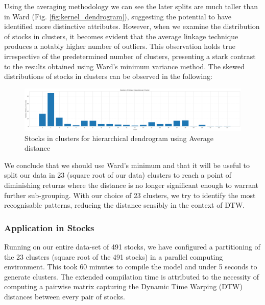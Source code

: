 \documentclass[11pt]{article}
\begin{document}
Using the averaging methodology we can see the later splits are much taller than in Ward (Fig. \ref{fig:kernel_dendrogram}), suggesting the potential to have identified more distinctive attributes. However, when we examine the distribution of stocks in clusters, it becomes evident that the average linkage technique produces a notably higher number of outliers. This observation holds true irrespective of the predetermined number of clusters, presenting a stark contrast to the results obtained using Ward's minimum variance method. The skewed distributions of stocks in clusters can be observed in the following:

\begin{figure}[H]
\centering
\includegraphics[width=12cm]{img/hierarchical_average.png} 
\caption{Stocks in clusters for hierarchical dendrogram using Average distance}
\label{fig:average_dendrogram}
\end{figure}

We conclude that we should use Ward's minimum and that it will be useful to split our data in 23 (square root of our data) clusters to reach a point of diminishing returns where the distance is no longer significant enough to warrant further sub-grouping. With our choice of 23 clusters, we try to identify the most recognisable patterns, reducing the distance sensibly in the context of DTW.

\subsubsection{Application in Stocks}

Running on our entire data-set of 491 stocks, we have configured a partitioning of the 23 clusters (square root of the 491 stocks) in a parallel computing environment. This took 60 minutes to compile the model and under 5 seconds to generate clusters. The extended compilation time is attributed to the necessity of computing a pairwise matrix capturing the Dynamic Time Warping (DTW) distances between every pair of stocks.
\end{document}
